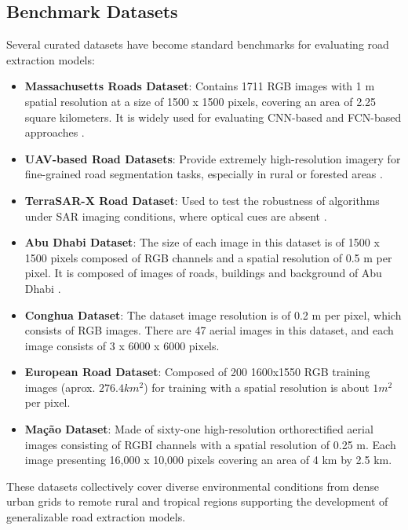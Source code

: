 \documentclass[conference]{IEEEtran}
\begin{document}
\subsection{Benchmark Datasets}

Several curated datasets have become standard benchmarks for evaluating road
extraction models:

\begin{itemize}
    \item \textbf{Massachusetts Roads Dataset}: Contains 1711 RGB images with 1 m spatial resolution at a size of 1500 x 1500 pixels, covering an area of 2.25 square kilometers. It is widely used for evaluating CNN-based and FCN-based approaches \cite{rs12091444} \cite{rs12182985} \cite{7729406} \cite{ALSHEHHI2017139} \cite{10.1007/978-3-319-60663-7_18} \cite{8605652} \cite{8447193} \cite{rs11212499}.
    \item \textbf{UAV-based Road Datasets}: Provide extremely high-resolution imagery for fine-grained road segmentation tasks, especially in rural or forested areas \cite{8628717}.
    \item \textbf{TerraSAR-X Road Dataset}: Used to test the robustness of algorithms under SAR imaging conditions, where optical cues are absent \cite{8447237}.
    \item \textbf{Abu Dhabi Dataset}: The size of each image in this dataset is of 1500 x 1500 pixels composed of RGB channels and a spatial resolution of 0.5 m per pixel. It is composed of images of roads, buildings and background of Abu Dhabi \cite{ALSHEHHI2017139}.
    \item \textbf{Conghua Dataset}: The dataset image resolution is of 0.2 m per pixel, which consists of RGB images. There are 47 aerial images in this dataset, and each image consists of 3 x 6000 x 6000 pixels. \cite{rs11212499}
    \item \textbf{European Road Dataset}: Composed of 200 1600x1550 RGB training images (aprox. $276.4 km^2$) for training with a spatial resolution is about $1 m^2$ per pixel. \cite{8265456}
    \item \textbf{Mação Dataset}: Made of sixty-one high-resolution orthorectified aerial images consisting of RGBI channels with a spatial resolution of 0.25 m. Each image presenting 16,000 x 10,000 pixels covering an area of 4 km by 2.5 km. \cite{rs15010271}
\end{itemize}

These datasets collectively cover diverse environmental conditions from dense
urban grids to remote rural and tropical regions supporting the development of
generalizable road extraction models.
\end{document}
